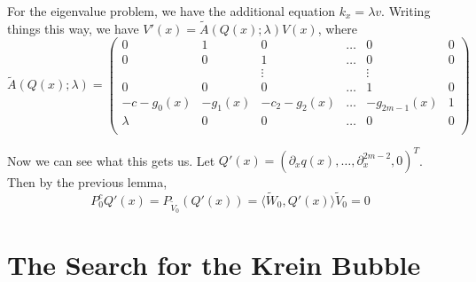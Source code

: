 \documentclass[thesis.tex]{subfiles}
\begin{document}
For the eigenvalue problem, we have the additional equation $k_x = \lambda v$. Writing things this way, we have
$V'(x) = \tilde{A}(Q(x); \lambda)V(x)$, where
\[
\tilde{A}(Q(x); \lambda) = 
\begin{pmatrix}
0 & 1 & 0 & \dots & 0 & 0\\
0 & 0 & 1 & \dots & 0 & 0\\
&& \vdots && \vdots \\
0 & 0 & 0 & \dots & 1 & 0\\
-c - g_0(x) & -g_1(x) & -c_2 - g_2(x) & \dots 
& -g_{2m-1}(x) & 1 \\
\lambda & 0 & 0 & \dots & 0 & 0 \\
\end{pmatrix}
\]

Now we can see what this gets us. Let $Q'(x) = (\partial_x q(x), \dots, \partial_x^{2m-2}, 0)^T$. Then by the previous lemma,
\[
P^c_0 Q'(x) = P_{\tilde{V}_0}(Q'(x)) = \langle \tilde{W}_0, Q'(x) \rangle \tilde{V}_0 = 0
\]

\section{The Search for the Krein Bubble}
\end{document}
